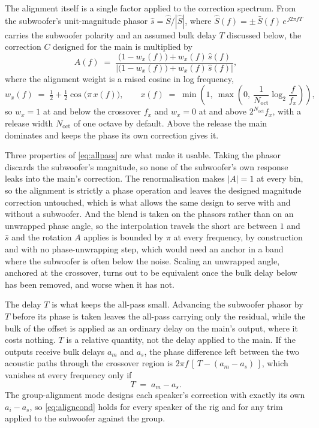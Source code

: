 \documentclass[10pt,a4paper]{article}
\begin{document}
The alignment itself is a single factor applied to the correction spectrum. From the subwoofer's unit-magnitude phasor $\hat s = \hat S/|\hat S|$, where $\hat S(f) = \pm\,\bar S(f)\,e^{\,j2\pi f T}$ carries the subwoofer polarity and an assumed bulk delay $T$ discussed below, the correction $C$ designed for the main is multiplied by
\begin{equation}
  A(f) \;=\; \frac{\bigl(1-w_x(f)\bigr) + w_x(f)\,\hat s(f)}
                  {\bigl|\bigl(1-w_x(f)\bigr) + w_x(f)\,\hat s(f)\bigr|},
  \label{eq:allpass}
\end{equation}
where the alignment weight is a raised cosine in log frequency,
\begin{equation}
  w_x(f) \;=\; \tfrac{1}{2} + \tfrac{1}{2}\cos\bigl(\pi\, x(f)\bigr),
  \qquad
  x(f) \;=\; \min\!\left(1,\ \max\!\left(0,\ \frac{1}{N_{\mathrm{oct}}}\log_2\frac{f}{f_x}\right)\right),
  \label{eq:alignweight}
\end{equation}
so $w_x=1$ at and below the crossover $f_x$ and $w_x=0$ at and above $2^{N_{\mathrm{oct}}} f_x$, with a release width $N_{\mathrm{oct}}$ of one octave by default. Above the release the main dominates and keeps the phase its own correction gives it.

Three properties of \eqref{eq:allpass} are what make it usable. Taking the phasor discards the subwoofer's magnitude, so none of the subwoofer's own response leaks into the main's correction. The renormalisation makes $|A|=1$ at every bin, so the alignment is strictly a phase operation and leaves the designed magnitude correction untouched, which is what allows the same design to serve with and without a subwoofer. And the blend is taken on the phasors rather than on an unwrapped phase angle, so the interpolation travels the short arc between $1$ and $\hat s$ and the rotation $A$ applies is bounded by $\pi$ at every frequency, by construction and with no phase-unwrapping step, which would need an anchor in a band where the subwoofer is often below the noise. Scaling an unwrapped angle, anchored at the crossover, turns out to be equivalent once the bulk delay below has been removed, and worse when it has not.

The delay $T$ is what keeps the all-pass small. Advancing the subwoofer phasor by $T$ before its phase is taken leaves the all-pass carrying only the residual, while the bulk of the offset is applied as an ordinary delay on the main's output, where it costs nothing. $T$ is a relative quantity, not the delay applied to the main. If the outputs receive bulk delays $a_m$ and $a_s$, the phase difference left between the two acoustic paths through the crossover region is $2\pi f\,[\,T-(a_m-a_s)\,]$, which vanishes at every frequency only if
\begin{equation}
  T \;=\; a_m - a_s .
  \label{eq:aligncond}
\end{equation}
The group-alignment mode designs each speaker's correction with exactly its own $a_i - a_s$, so \eqref{eq:aligncond} holds for every speaker of the rig and for any trim applied to the subwoofer against the group.
\end{document}
